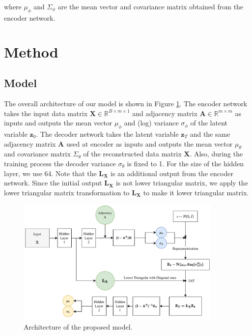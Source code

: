 \documentclass[10pt]{article}
\begin{document}
where $\mu_\phi$ and $\Sigma_\phi$ are the mean vector and covariance matrix obtained from the encoder network.\\

\section{Method}

\subsection{Model}

The overall architecture of our model is shown in Figure \ref*{diagram}. The encoder network takes the input data matrix $\mathbf{X}\in \mathbb{R}^{B \times m \times 1}$ and adjacency matrix $\mathbf{A}\in \mathbb{R}^{m \times m}$ as inputs and outputs the mean vector $\mu_\phi$ and (log) variance $\sigma_\phi$ of the latent variable $\mathbf{z}_0$. The decoder network takes the latent variable $\mathbf{z}_T$ and the same adjacency matrix $\mathbf{A}$ used at encoder as inputs and outputs the mean vector $\mu_\theta$ and covariance matrix $\Sigma_\theta$ of the reconstructed data matrix $\mathbf{X}$. Also, during the training process the decoder variance $\sigma_\theta$ is fixed to 1. For the size of the hidden layer, we use 64. Note that the $\mathbf{L_X}$ is an additional output from the encoder network. Since the initial output $\mathbf{L_X}$ is not lower triangular matrix, we apply the lower triangular matrix transformation to $\mathbf{L_X}$ to make it lower triangular matrix.

\begin{figure}[H]
    \centering
    \includegraphics[width=0.9\textwidth]{fig/model.pdf}
    \caption{Architecture of the proposed model.}
    \label{diagram}
\end{figure}
\end{document}
